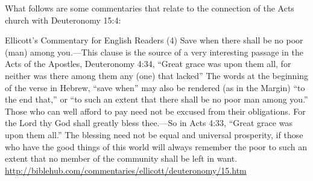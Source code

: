 \documentclass[11pt]{article}
\begin{document}
%

What follows are some commentaries that relate to the connection of the Acts church with Deuteronomy 15:4:\newline

Ellicott's Commentary for English Readers
(4) Save when there shall be no poor (man) among you.—This clause is the source of a very interesting passage in the Acts of the Apostles, Deuteronomy 4:34, “Great grace was upon them all, for neither was there among them any (one) that lacked” The words at the beginning of the verse in Hebrew, “save when” may also be rendered (as in the Margin) “to the end that,” or “to such an extent that there shall be no poor man among you.” Those who can well afford to pay need not be excused from their obligations.
For the Lord thy God shall greatly bless thee.—So in Acts 4:33, “Great grace was upon them all.” The blessing need not be equal and universal prosperity, if those who have the good things of this world will always remember the poor to such an extent that no member of the community shall be left in want.
\url{http://biblehub.com/commentaries/ellicott/deuteronomy/15.htm}\newline
\end{document}
